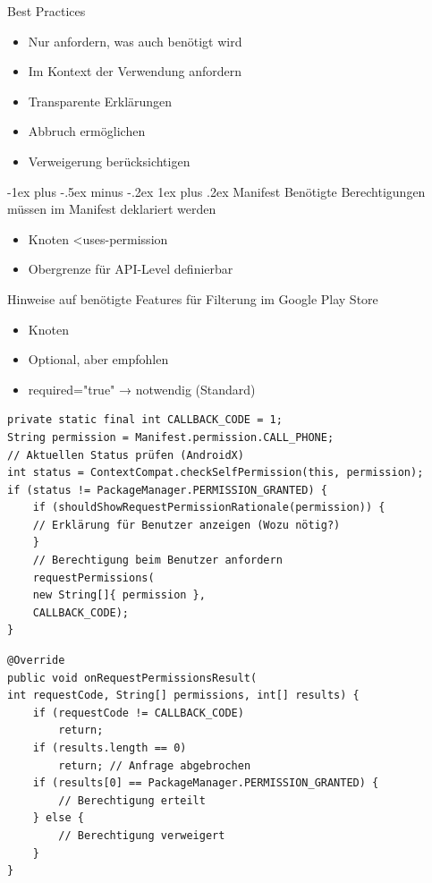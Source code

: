 \documentclass[10pt,landscape,a4paper]{article}
\makeatletter
\renewcommand{\subsubsection}{\@startsection{subsubsection}{3}{0mm}%
                                {-1ex plus -.5ex minus -.2ex}%
                                {1ex plus .2ex}%
                                {\normalfont\footnotesize\bfseries}}
\makeatother
\begin{document}
\begin{multicols*}{3}
Best Practices
\begin{itemize}[leftmargin=*]
\item{Nur anfordern, was auch benötigt wird}
\item{Im Kontext der Verwendung anfordern}
\item{Transparente Erklärungen}
\item{Abbruch ermöglichen}
\item{Verweigerung berücksichtigen}
\end{itemize}

\subsubsection{Manifest}
Benötigte Berechtigungen müssen im
Manifest deklariert werden
\begin{itemize}[leftmargin=*]
\item{Knoten <uses-permission}
\item{Obergrenze für API-Level definierbar}
\end{itemize}

Hinweise auf benötigte Features für Filterung im Google Play Store
\begin{itemize}[leftmargin=*]
\item{Knoten }
\item{Optional, aber empfohlen}
\item{required="true" → notwendig (Standard)}
\end{itemize}
\begin{verbatim}
private static final int CALLBACK_CODE = 1;
String permission = Manifest.permission.CALL_PHONE;
// Aktuellen Status prüfen (AndroidX)
int status = ContextCompat.checkSelfPermission(this, permission);
if (status != PackageManager.PERMISSION_GRANTED) {
    if (shouldShowRequestPermissionRationale(permission)) {
    // Erklärung für Benutzer anzeigen (Wozu nötig?)
    }
    // Berechtigung beim Benutzer anfordern
    requestPermissions(
    new String[]{ permission },
    CALLBACK_CODE);
}
\end{verbatim}

\begin{verbatim}
@Override
public void onRequestPermissionsResult(
int requestCode, String[] permissions, int[] results) {
    if (requestCode != CALLBACK_CODE)
        return;
    if (results.length == 0)
        return; // Anfrage abgebrochen
    if (results[0] == PackageManager.PERMISSION_GRANTED) {
        // Berechtigung erteilt
    } else {
        // Berechtigung verweigert
    }
}
\end{verbatim}


\end{multicols*}
\end{document}
